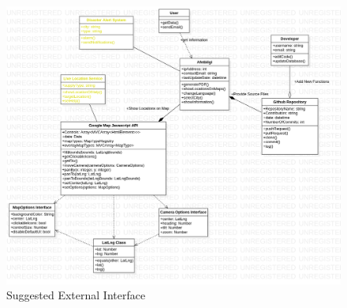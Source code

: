 \begin{figure}[H]
    \includegraphics[scale = 0.4]{assets/ExternalInterfaceSuggestion.png}
    \caption[Suggested External Interface]{Suggested External Interface}
\end{figure}


